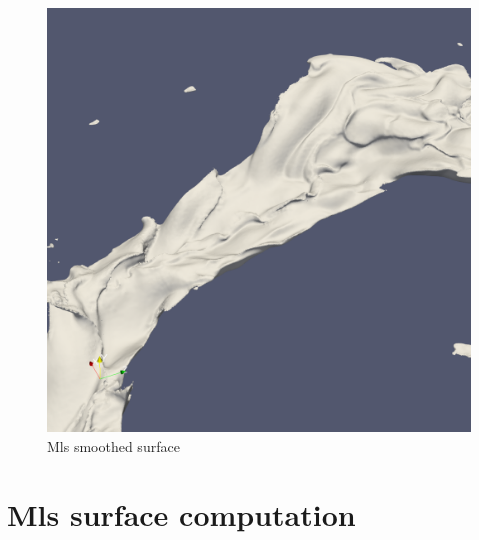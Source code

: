 \begin{figure}
	\begin{center}
		\includegraphics[width=\textwidth]{figures/CanionMls1.png}
	\end{center}
	\caption{Mls smoothed surface}
	\label{fig:mls_motivation}
\end{figure}
\section{Mls surface computation}

